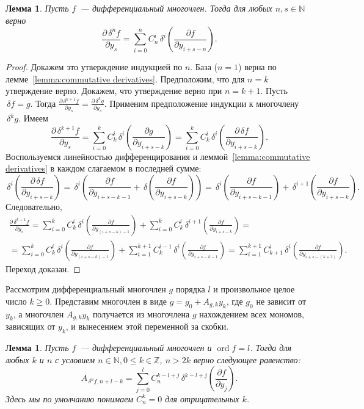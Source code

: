 \documentclass[11pt]{article}
\DeclareMathOperator{\ord}{ord}
\renewcommand{\le}{\leqslant}
\renewcommand{\ge}{\geqslant}
\newtheorem{lemma}[theorem1]{Лемма}
\theoremstyle{plain}
\theoremstyle{definition}
\theoremstyle{remark}
\begin{document}
\begin{lemma}\label{lemma:f^(n)}
Пусть $f$~--- дифференциальный многочлен. Тогда для любых $n, s \in\mathbb{N}$ верно
$$
\frac{\partial \,\delta^n f}{\partial y_s} = \sum\limits_{i=0}^n  C_n^i  \,\delta^i \left(\frac{\partial f}{\partial y_{i+s-n}}\right).
$$
\end{lemma}
\begin{proof}
Докажем это утверждение индукцией по $n$.  База ($n=1$) верна по лемме~\ref{lemma:commutative derivatives}. Предположим, что для $n=k$ утверждение верно.
Докажем, что утверждение верно при $n=k+1$. Пусть $\,\delta f=g$. Тогда
$\frac{\partial \,\delta^{k+1} f}{\partial y_s} = \frac{\partial \,\delta^k g}{\partial y_s}$.
Применим предположение индукции к многочлену $\,\delta^k g$. Имеем 
$$
\frac{\partial \,\delta^{k+1} f}{\partial y_s} =  \sum\limits_{i=0}^k  C_k^i  \,\delta^i \left(\frac{\partial g}{\partial y_{i+s-k}}\right)=\sum\limits_{i=0}^k  C_k^i  \,\delta^i \left(\frac{\partial \,\delta f}{\partial y_{i+s-k}}\right). 
$$
Воспользуемся линейностью дифференцирования и леммой~\ref{lemma:commutative derivatives} в каждом слагаемом в последней сумме:  
$$
\,\delta^i \left(\frac{\partial \,\delta f}{\partial y_{i+s-k}}\right)=\,\delta^i\left(\frac{\partial f}{\partial y_{i+s-k-1}}+\,\delta\left(\frac{\partial f}{\partial y_{i+s-k}}\right)\right)=\,\delta^i\left(\frac{\partial f}{\partial y_{i+s-k-1}}\right)+\,\delta^{i+1}\left(\frac{\partial f}{\partial y_{i+s-k}}\right).
$$ 
Следовательно,
\begin{gather*}
\frac{\partial \,\delta^{k+1} f}{\partial y_s}=\sum\limits_{i=0}^k  C_k^i \,\delta^i \left(\frac{\partial f}{\partial y_{(i+s-k)-1}}\right)+\sum\limits_{i=0}^k  C_k^i \,\delta^{i+1} \left(\frac{\partial f}{\partial y_{i+s-k}}\right) = \\
= \sum\limits_{i=0}^k  C_k^i \,\delta^i \left(\frac{\partial f}{\partial y_{(i+s-k)-1}}\right)+\sum\limits_{i=1}^{k+1}  C_k^{i-1}\,\delta^i \left(\frac{\partial f}{\partial y_{i+s-k-1}}\right)=\sum\limits_{i=1}^{k+1} C_{k+1}^{i}\,\delta^i\left(\frac{\partial f}{\partial y_{i+s-(k+1)}}\right).
\end{gather*}
Переход доказан.
\end{proof}
Рассмотрим дифференциальный многочлен $g$ порядка $l$ и произвольное
целое число $k\ge0$. Представим многочлен в виде $g=g_0+A_{g,k}y_k$, где
$g_0$ не зависит от $y_k$, а многочлен $A_{g,k} y_k$ получается из
многочлена $g$ нахождением всех мономов, зависящих от $y_k$, и
вынесением этой переменной за скобки.
\begin{lemma}\label{lemma:A_fn}
Пусть $f$~--- дифференциальный многочлен и $\ord f = l$.
Тогда для любых $k$ и $n$ с условием  $n\in\mathbb{N},0\le k\in\mathbb{Z}$, $n>2k$ верно следующее
равенство:
$$
A_{\,\delta^n f, n+l-k}=\sum\limits_{j=0}^{l}C_n^{k - l + j
}\,\delta^{k-l+j}\left(\frac{\partial f}{\partial y_j}\right).
$$
Здесь мы по умолчанию понимаем $C_n^{k}=0$ для отрицательных
$k$.
\end{lemma}
\end{document}
